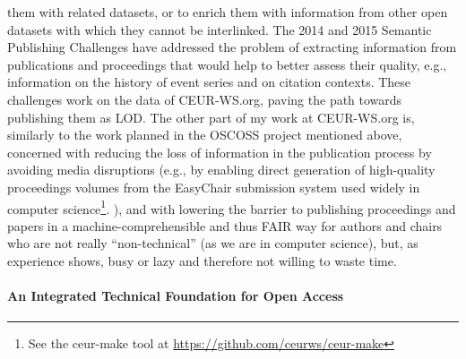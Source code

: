 \documentclass[a4paper,UKenglish]{dagrep}
\begin{document}
them with related datasets, or to enrich them with information from other open
datasets with which they cannot be interlinked.
The 2014 and 2015 Semantic Publishing Challenges have addressed the problem of
extracting information from publications and proceedings that would help to
better assess their quality, e.g., information on the history of event series
and on citation contexts.
These challenges work on the data of CEUR-WS.org, paving the path towards
publishing them as LOD.
The other part of my work at CEUR-WS.org is, similarly to the work planned in
the OSCOSS project mentioned above, concerned with reducing the loss of
information in the publication process by avoiding media disruptions (e.g., by
enabling direct generation of high-quality proceedings volumes from the
EasyChair submission system used widely in computer science\footnote{%
See the ceur-make tool at \url{https://github.com/ceurws/ceur-make}}.%
), and with lowering the barrier to publishing proceedings and papers in a
machine-comprehensible and thus FAIR way for authors and chairs who are not
really ``non-technical'' (as we are in computer science), but, as experience
shows, busy or lazy and therefore not willing to waste time.

\paragraph{An Integrated Technical Foundation for Open Access}
\end{document}
